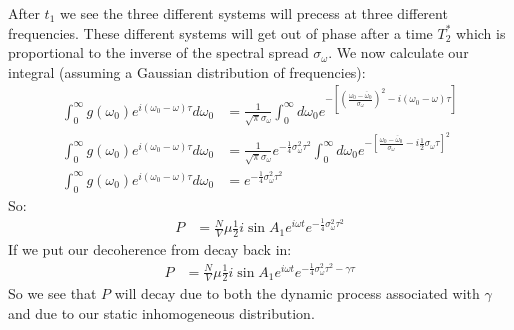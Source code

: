 After $t_1$ we see the three different systems will precess at three different frequencies. These different systems will get out of phase after a time $T_2^*$ which is proportional to the inverse of the spectral spread $\sigma_\omega$.
We now calculate our integral (assuming a Gaussian distribution of frequencies):
\begin{align*}
	\int_0^\infty g(\omega_0) e^{i(\omega_0 - \omega)\tau} d\omega_0 &= \frac{1}{\sqrt{\pi}\sigma_\omega} \int_0^\infty d\omega_0 e^{-\left[\left(\frac{\omega_0 - \bar{\omega}_0}{\sigma_\omega}\right)^2 - i(\omega_0 - \omega) \tau\right]} \\
	\int_0^\infty g(\omega_0) e^{i(\omega_0 - \omega)\tau} d\omega_0 &= \frac{1}{\sqrt{\pi}\sigma_\omega} e^{-\frac{1}{4} \sigma_\omega^2\tau^2}
	\int_0^\infty d\omega_0 e^{-\left[\frac{\omega_0 - \bar{\omega}_0}{\sigma_\omega} - i\frac{1}{2}\sigma_\omega \tau\right]^2} \\
	\int_0^\infty g(\omega_0) e^{i(\omega_0 - \omega)\tau} d\omega_0 &= e^{-\frac{1}{4} \sigma_\omega^2\tau^2}
\end{align*}
So:
\begin{align*}
	P &= \frac{N}{V} \mu \frac{1}{2} i\sin A_1 e^{i\omega t} e^{-\frac{1}{4}\sigma_\omega^2\tau^2}
\end{align*}
If we put our decoherence from decay back in:
\begin{align*}
	P &= \frac{N}{V} \mu \frac{1}{2} i\sin A_1 e^{i\omega t} e^{-\frac{1}{4}\sigma_\omega^2\tau^2 - \gamma \tau}
\end{align*}
So we see that $P$ will decay due to both the dynamic process associated with $\gamma$ and due to our static inhomogeneous distribution.

